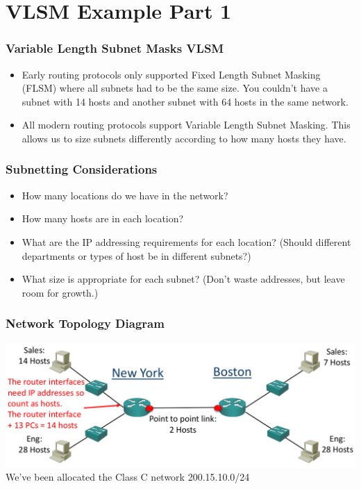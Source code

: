 \documentclass[pdflatex,compress]{beamer}
\begin{document}
\section{VLSM Example Part 1}

\begin{frame}
	\frametitle{Variable Length Subnet Masks VLSM}
	\begin{itemize}
		\item Early routing protocols only supported Fixed Length Subnet Masking (FLSM) where all subnets had to be the same size. You couldn't have a subnet with 14 hosts and another subnet with 64 hosts in the same network.
		\item All modern routing protocols support Variable Length Subnet Masking. This allows us to size subnets differently according to how many hosts they have.
	\end{itemize}
\end{frame}

\begin{frame}
	\frametitle{Subnetting Considerations}
	\begin{itemize}
		\item How many locations do we have in the network?
		\item How many hosts are in each location?
		\item What are the IP addressing requirements for each location? (Should different departments or types of host be in different subnets?)
		\item What size is appropriate for each subnet? (Don't waste addresses, but leave room for growth.)
	\end{itemize}
\end{frame}

\begin{frame}
	\frametitle{Network Topology Diagram}
	\begin{center}
		\includegraphics[width=\linewidth]{img/img09}
		We've been allocated the Class C network 200.15.10.0/24
	\end{center}
\end{frame}
\end{document}
